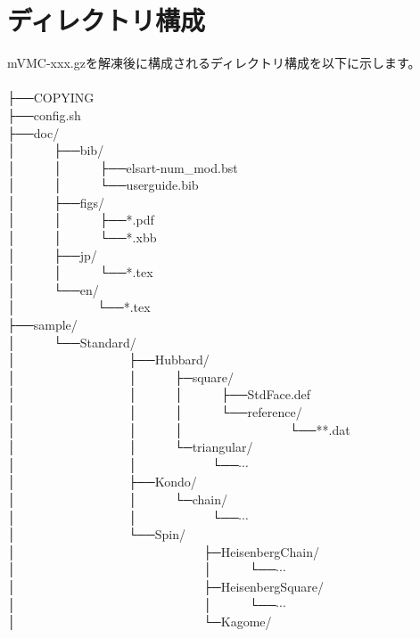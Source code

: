 \section{ディレクトリ構成}
mVMC-xxx.gzを解凍後に構成されるディレクトリ構成を以下に示します。\\
\\
├──COPYING\\
├──config.sh\\
├──doc/\\
│~~~~~~├──bib/\\
│~~~~~~│~~~~~~├──elsart-num\_mod.bst\\
│~~~~~~│~~~~~~└──userguide.bib\\
│~~~~~~├──figs/\\
│~~~~~~│~~~~~~├──*.pdf\\
│~~~~~~│~~~~~~└──*.xbb\\
│~~~~~~├──jp/\\
│~~~~~~│~~~~~~└──*.tex\\
│~~~~~~└──en/\\
│~~~~~~~~~~~~~└──*.tex\\
├──sample/\\
│~~~~~~└──Standard/\\
│~~~~~~~~~~~~~~~~~~├──Hubbard/\\
│~~~~~~~~~~~~~~~~~~│~~~~~~├─square/\\
│~~~~~~~~~~~~~~~~~~│~~~~~~│~~~~~~├──StdFace.def\\
│~~~~~~~~~~~~~~~~~~│~~~~~~│~~~~~~└──reference/\\
│~~~~~~~~~~~~~~~~~~│~~~~~~│~~~~~~~~~~~~~~~~~└──**.dat\\
│~~~~~~~~~~~~~~~~~~│~~~~~~└─triangular/\\
│~~~~~~~~~~~~~~~~~~│~~~~~~~~~~~~└──$\cdots$\\
│~~~~~~~~~~~~~~~~~~├──Kondo/\\
│~~~~~~~~~~~~~~~~~~│~~~~~~└─chain/\\
│~~~~~~~~~~~~~~~~~~│~~~~~~~~~~~~└──$\cdots$\\
│~~~~~~~~~~~~~~~~~~└──Spin/\\
│~~~~~~~~~~~~~~~~~~~~~~~~~~~~~~├─HeisenbergChain/\\
│~~~~~~~~~~~~~~~~~~~~~~~~~~~~~~│~~~~~~└──$\cdots$\\
│~~~~~~~~~~~~~~~~~~~~~~~~~~~~~~├─HeisenbergSquare/\\
│~~~~~~~~~~~~~~~~~~~~~~~~~~~~~~│~~~~~~└──$\cdots$\\
│~~~~~~~~~~~~~~~~~~~~~~~~~~~~~~└─Kagome/\\
